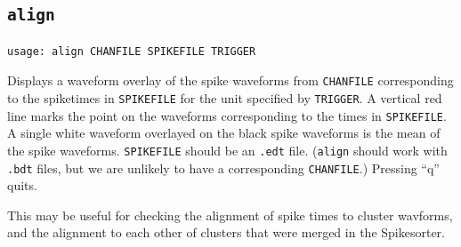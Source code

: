 \documentclass[12pt]{article}
\begin{document}
\subsection{\tt align}
\label{align}
\begin{verbatim}
usage: align CHANFILE SPIKEFILE TRIGGER
\end{verbatim}
Displays a waveform overlay of the spike waveforms from {\tt CHANFILE}
corresponding to the spiketimes in {\tt SPIKEFILE} for the unit
specified by {\tt TRIGGER}.  A vertical red line marks the point on
the waveforms corresponding to the times in {\tt SPIKEFILE}.  A single
white waveform overlayed on the black spike waveforms is the mean of
the spike waveforms.  {\tt SPIKEFILE} should be an {\tt .edt} file.
({\tt align} should work with {\tt .bdt} files, but we are unlikely to
have a corresponding {\tt CHANFILE}.) Pressing ``q'' quits.

This may be useful for checking the alignment of spike times to
cluster wavforms, and the alignment to each other of clusters that
were merged in the Spikesorter.

\clearpage
\nocite{letelier2000spike}
\nocite{harris2000accuracy}



\end{document}
